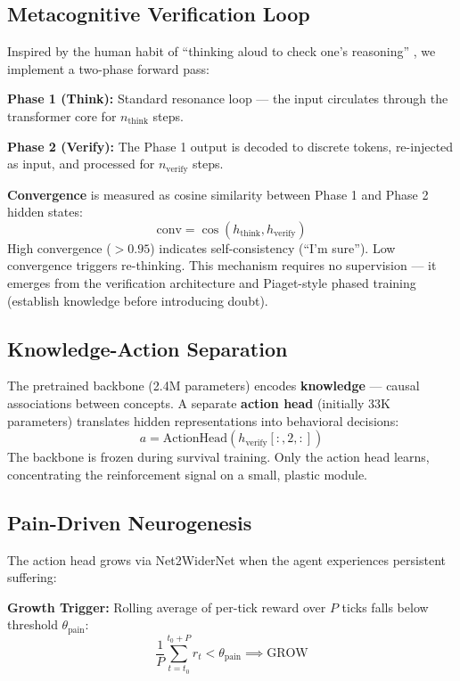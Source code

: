 \documentclass{article}
\begin{document}
\subsection{Metacognitive Verification Loop}
\label{sec:metacognition}
Inspired by the human habit of ``thinking aloud to check one's reasoning'' \cite{flavell1979metacognition}, we implement a two-phase forward pass:

\textbf{Phase 1 (Think):} Standard resonance loop --- the input circulates through the transformer core for $n_{\text{think}}$ steps.

\textbf{Phase 2 (Verify):} The Phase 1 output is decoded to discrete tokens, re-injected as input, and processed for $n_{\text{verify}}$ steps.

\textbf{Convergence} is measured as cosine similarity between Phase 1 and Phase 2 hidden states:
\begin{equation}
\text{conv} = \cos(h_{\text{think}}, h_{\text{verify}})
\end{equation}
High convergence ($>0.95$) indicates self-consistency (``I'm sure''). Low convergence triggers re-thinking. This mechanism requires no supervision --- it emerges from the verification architecture and Piaget-style phased training (establish knowledge before introducing doubt).

\subsection{Knowledge-Action Separation}
\label{sec:separation}
The pretrained backbone (2.4M parameters) encodes \textbf{knowledge} --- causal associations between concepts. A separate \textbf{action head} (initially 33K parameters) translates hidden representations into behavioral decisions:
\begin{equation}
a = \text{ActionHead}(h_{\text{verify}}[:, 2, :])
\end{equation}
The backbone is frozen during survival training. Only the action head learns, concentrating the reinforcement signal on a small, plastic module.

\subsection{Pain-Driven Neurogenesis}
\label{sec:neurogenesis}
The action head grows via Net2WiderNet \cite{chen2015net2net} when the agent experiences persistent suffering:

\textbf{Growth Trigger:} Rolling average of per-tick reward over $P$ ticks falls below threshold $\theta_{\text{pain}}$:
\begin{equation}
\frac{1}{P}\sum_{t=t_0}^{t_0+P} r_t < \theta_{\text{pain}} \implies \text{GROW}
\end{equation}
\end{document}
